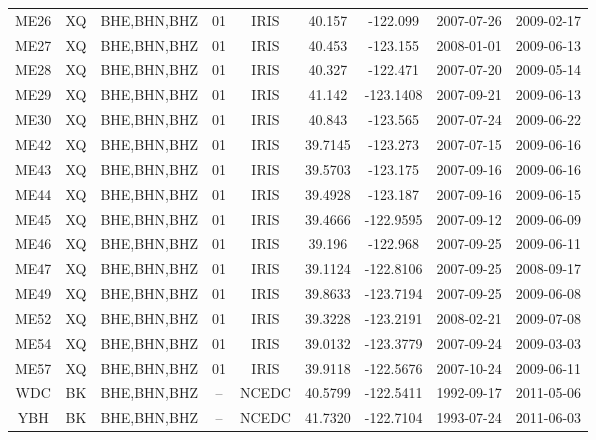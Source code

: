 \documentclass[draft]{agujournal2019}
\begin{document}
\begin{table}[hbt!]
\begin{tabular}{c c c c c c c c c}
ME26 & XQ & BHE,BHN,BHZ & 01 & IRIS & 40.157 & -122.099 & 2007-07-26 & 2009-02-17 \\
ME27 & XQ & BHE,BHN,BHZ & 01 & IRIS & 40.453 & -123.155 & 2008-01-01 & 2009-06-13 \\
ME28 & XQ & BHE,BHN,BHZ & 01 & IRIS & 40.327 & -122.471 & 2007-07-20 & 2009-05-14 \\
ME29 & XQ & BHE,BHN,BHZ & 01 & IRIS & 41.142 & -123.1408 & 2007-09-21 & 2009-06-13 \\
ME30 & XQ & BHE,BHN,BHZ & 01 & IRIS & 40.843 & -123.565 & 2007-07-24 & 2009-06-22 \\
ME42 & XQ & BHE,BHN,BHZ & 01 & IRIS & 39.7145 & -123.273 & 2007-07-15 & 2009-06-16 \\
ME43 & XQ & BHE,BHN,BHZ & 01 & IRIS & 39.5703 & -123.175 & 2007-09-16 & 2009-06-16 \\
ME44 & XQ & BHE,BHN,BHZ & 01 & IRIS & 39.4928 & -123.187 & 2007-09-16 & 2009-06-15 \\
ME45 & XQ & BHE,BHN,BHZ & 01 & IRIS & 39.4666 & -122.9595 & 2007-09-12 & 2009-06-09 \\
ME46 & XQ & BHE,BHN,BHZ & 01 & IRIS & 39.196 & -122.968 & 2007-09-25 & 2009-06-11 \\
ME47 & XQ & BHE,BHN,BHZ & 01 & IRIS & 39.1124 & -122.8106 & 2007-09-25 & 2008-09-17 \\
ME49 & XQ & BHE,BHN,BHZ & 01 & IRIS & 39.8633 & -123.7194 & 2007-09-25 & 2009-06-08 \\
ME52 & XQ & BHE,BHN,BHZ & 01 & IRIS & 39.3228 & -123.2191 & 2008-02-21 & 2009-07-08 \\
ME54 & XQ & BHE,BHN,BHZ & 01 & IRIS & 39.0132 & -123.3779 & 2007-09-24 & 2009-03-03 \\
ME57 & XQ & BHE,BHN,BHZ & 01 & IRIS & 39.9118 & -122.5676 & 2007-10-24 & 2009-06-11 \\
WDC & BK & BHE,BHN,BHZ & -- & NCEDC & 40.5799 & -122.5411 &1992-09-17 & 2011-05-06 \\
YBH &  BK & BHE,BHN,BHZ & -- & NCEDC & 41.7320 & -122.7104 & 1993-07-24 & 2011-06-03 \\
\hline
\end{tabular}
\end{table}

\newpage
\end{document}
